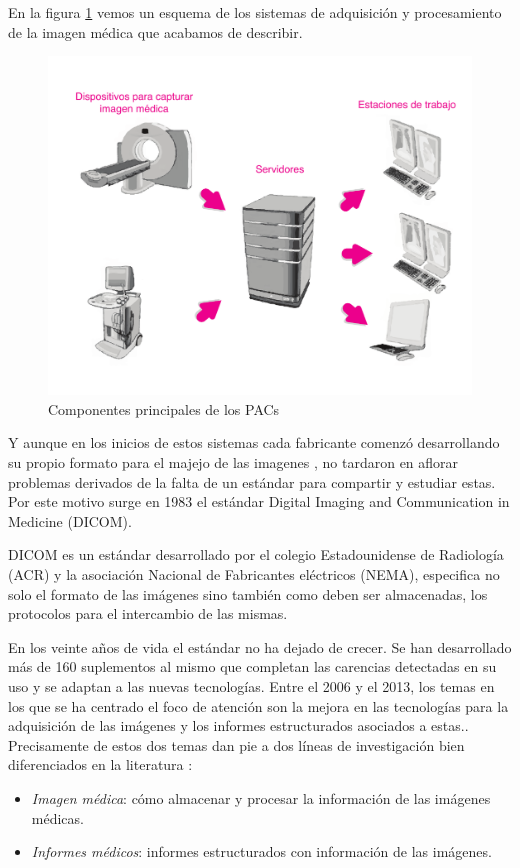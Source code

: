  En la figura \ref{fig:pacs} vemos un esquema de los sistemas de adquisición y procesamiento de la imagen médica que acabamos de describir.\par
\begin{figure}[ht]
\centering
\includegraphics[scale=0.6]{./imgs/esquemas/pacs.pdf}
\caption{Componentes principales de los PACs}
\label{fig:pacs}
\end{figure}

\medskip\par

Y aunque en los inicios de estos sistemas cada fabricante comenzó desarrollando su propio formato para el majejo de las imagenes \cite{huang2011short, lemke2011short}, no tardaron en aflorar problemas derivados de la falta de un estándar para compartir y estudiar estas. Por este motivo surge en 1983 el estándar  Digital Imaging and Communication in Medicine (DICOM).\medskip\par

DICOM es un estándar \cite{bidgood1992introduction} desarrollado por el colegio Estadounidense de Radiología (ACR) y la asociación Nacional de Fabricantes eléctricos (NEMA), especifica no  solo el formato de las imágenes sino también como deben ser almacenadas, los protocolos para el intercambio de las mismas. \par
En los veinte años de vida el estándar no ha dejado de crecer. Se han desarrollado más de 160 suplementos al mismo que completan las carencias detectadas en su uso y se adaptan a las nuevas tecnologías. Entre el 2006 y el 2013, los temas en los que se ha centrado el foco de atención son la mejora en las tecnologías para la adquisición de las imágenes y los informes estructurados asociados a estas.\cite{dicomtrends}.
Precisamente de estos dos temas dan pie a dos líneas de investigación bien diferenciados en la literatura \cite{torres2012improving}:
\begin{itemize}
	\item \textit{Imagen médica}: cómo almacenar y procesar la información de las imágenes médicas. 
	\item \textit{Informes médicos}: informes estructurados con información de las imágenes.  
\end{itemize}
\medskip\par

